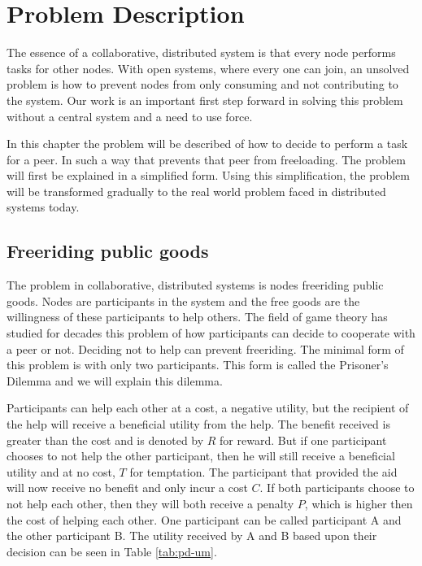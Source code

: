 \chapter{Problem Description}
The essence of a collaborative, distributed system is that every node performs tasks for other nodes.
With open systems, where every one can join, an unsolved problem is how to prevent nodes
from only consuming and not contributing to the system.
Our work is an important first step forward in solving this problem without a central system
and a need to use force.

In this chapter the problem will be described of how to decide to perform a task for a peer.
In such a way that prevents that peer from freeloading.
The problem will first be explained in a simplified form.
Using this simplification, the problem will be transformed gradually
to the real world problem faced in distributed systems today.

\section{Freeriding public goods}
The problem in collaborative, distributed systems is nodes freeriding public goods.
Nodes are participants in the system and the free goods are the willingness of these participants to help others.
The field of game theory has studied for decades this problem of how
participants can decide to cooperate with a peer or not\cite{Hardin-Tragedy}.
Deciding not to help can prevent freeriding.
The minimal form of this problem is with only two participants.
This form is called the Prisoner's Dilemma
and we will explain this dilemma\cite{Nowak-PrisonerDilemma}\cite{Lai-Incentives}.

Participants can help each other at a cost, a negative utility,
but the recipient of the help will receive a beneficial utility from the help.
The benefit received is greater than the cost and is denoted by $R$ for reward.
But if one participant chooses to not help the other participant,
then he will still receive a beneficial utility and at no cost, $T$ for temptation.
The participant that provided the aid will now receive no benefit and only incur a cost $C$.
If both participants choose to not help each other,
then they will both receive a penalty $P$, which is higher then the cost of helping each other.
One participant can be called participant A and the other participant B.
The utility received by A and B based upon their decision can be seen in Table \ref{tab:pd-um}.

